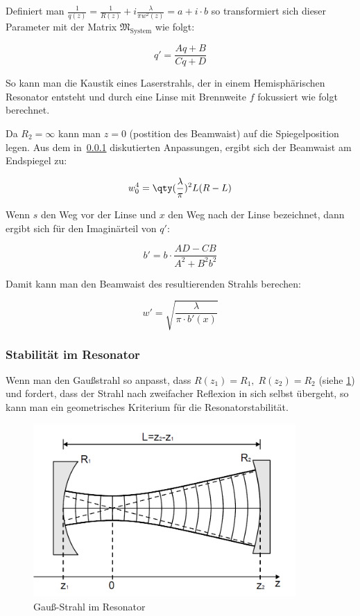 \documentclass[slug=GL, room=HZDR\ Dresden/Rossendorf\,\ Geb.\ 620/123, supervisor=Martin\ Rehwald;\, Tim\ Ziegler]{../../Lab_Report_LaTeX/lab_report}
\begin{document}
Definiert man \(\frac{1}{q(z)}=\frac{1}{R(z)}+i\frac{\lambda}{\pi
  w^2(z)}=a+i\cdot b\) so transformiert sich dieser Parameter mit der Matrix
\(\mathfrak{M}_{\text{System}}\) wie folgt:

\begin{equation}
  \label{eq:qtrans}
  q'=\frac{Aq + B}{Cq+D}
\end{equation}

So kann man die Kaustik eines Laserstrahls, der in einem
Hemisph\"arischen Resonator entsteht und durch eine Linse mit
Brennweite \(f\) fokussiert wie folgt berechnet.

Da \(R_2=\infty\) kann man \(z=0\) (postition des Beamwaist) auf die
Spiegelposition legen.  Aus dem in~\ref{sec:stabres} diskutierten
Anpassungen, ergibt sich der Beamwaist am Endspiegel zu:

\begin{equation}
  \label{eq:konfwaist}
  w_0^4=\qty(\frac{\lambda}{\pi})^2L(R-L)
\end{equation}

Wenn \(s\) den Weg vor der Linse und \(x\) den Weg nach der Linse
bezeichnet, dann ergibt sich f\"ur den Imagin\"arteil von \(q'\):

\begin{equation}
  \label{eq:qkaust}
  b'=b\cdot\frac{AD-CB}{A^2+B^2b^2}
\end{equation}

Damit kann man den Beamwaist des resultierenden Strahls berechen:

\begin{equation}
  \label{eq:reswaist}
  w'=\sqrt{\frac{\lambda}{\pi\cdot b'(x)}}
\end{equation}


\subsubsection{Stabilit\"at im Resonator}
\label{sec:stabres}

Wenn man den Gau\ss{}strahl so anpasst, dass \(R(z_1)=R_1,\;
R(z_2)=R_2\) (siehe \ref{fig:gauss-res}) und fordert, dass der Strahl
nach zweifacher Reflexion in sich selbst \"ubergeht, so kann man ein
geometrisches Kriterium f\"ur die Resonatorstabilit\"at.

\begin{figure}
  \includegraphics[width=10cm]{gauss-res.png}
  \caption[Gauss]{Gau\ss{}-Strahl im Resonator}
  \label{fig:gauss-res}
\end{figure}
\end{document}
